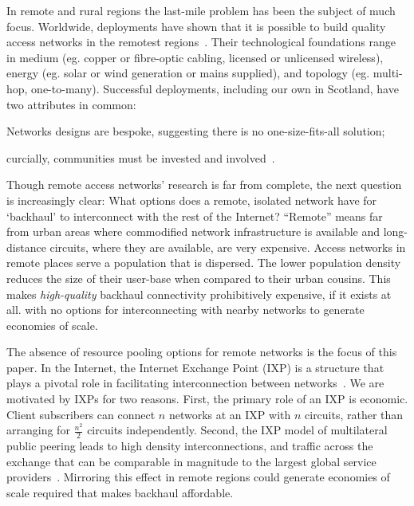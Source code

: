 In remote and rural regions the last-mile problem has been the subject of much
focus. Worldwide, deployments have shown that it is possible to build quality
access networks in the remotest regions~\cite{xxx}. Their technological
foundations range in medium (eg. copper or fibre-optic cabling, licensed
or unlicensed wireless), energy (eg. solar or wind generation or
mains supplied), and topology (eg. multi-hop,
one-to-many). Successful deployments, including our own in Scotland,
have two attributes in common:
\begin{inparaenum}[(i)]
  \item Networks designs are bespoke, suggesting
    there is no one-size-fits-all solution;
  \item curcially, communities must be invested and
  involved~\cite{Wallace:2015a,
    Wallace2015b}.
\end{inparaenum}

Though remote access networks' research is far from complete, the next question
is increasingly clear: What options does a remote, isolated network have for
`backhaul' to interconnect with the rest of the Internet? ``Remote'' means far
from urban areas where commodified network infrastructure is available and
long-distance circuits, where they are available, are very expensive. Access
networks in remote places serve a population that is dispersed. The lower
population density reduces the size of their user-base when compared to their
urban cousins. This makes \emph{high-quality} backhaul connectivity
prohibitively expensive, if it exists at all. with no options for
interconnecting with nearby networks to generate economies of scale.


The absence of resource pooling options for remote networks is the focus of this
paper. In the Internet, the Internet Exchange Point (\acf{IXP}) is a structure
that plays a pivotal role in facilitating interconnection between
networks~\cite{Ager::2012}. We are motivated by \acp{IXP} for two reasons.
First, the primary role of an \ac{IXP} is economic. Client subscribers can
connect $n$ networks at an IXP with $n$ circuits, rather than arranging for
$\frac{n^2}{2}$ circuits independently. Second, the \ac{IXP} model of
multilateral public peering leads to high density interconnections, and traffic
across the exchange that can be comparable in magnitude to the largest global
service providers~\cite{Ager:2012:ALE:2342356.2342393}. Mirroring this effect in
remote regions could generate economies of scale required that makes backhaul
affordable.

